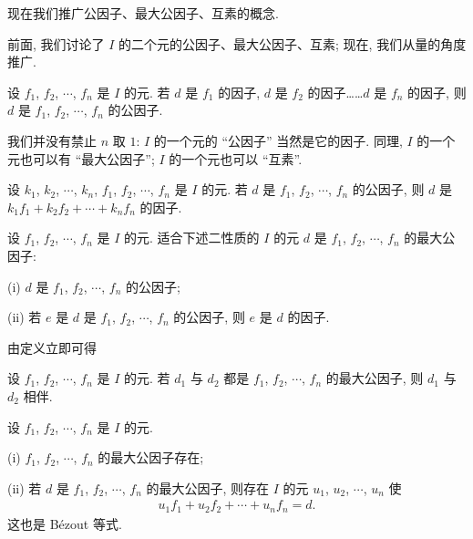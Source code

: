 现在我们推广公因子、最大公因子、互素的概念.

前面, 我们讨论了 $I$ 的二个元的公因子、最大公因子、互素; 现在, 我们从量的角度推广.

\begin{definition}
    设 $f_1$, $f_2$, $\cdots$, $f_n$ 是 $I$ 的元. 若 $d$ 是 $f_1$ 的因子, $d$ 是 $f_2$ 的因子……$d$ 是 $f_n$ 的因子, 则 $d$ 是 $f_1$, $f_2$, $\cdots$, $f_n$ 的公因子.
\end{definition}

\begin{remark}
    我们并没有禁止 $n$ 取 $1$: $I$ 的一个元的 ``公因子'' 当然是它的因子. 同理, $I$ 的一个元也可以有 ``最大公因子''; $I$ 的一个元也可以 ``互素''.
\end{remark}

\begin{proposition}
    设 $k_1$, $k_2$, $\cdots$, $k_n$, $f_1$, $f_2$, $\cdots$, $f_n$ 是 $I$ 的元. 若 $d$ 是 $f_1$, $f_2$, $\cdots$, $f_n$ 的公因子, 则 $d$ 是 $k_1 f_1 + k_2 f_2 + \cdots + k_n f_n$ 的因子.
\end{proposition}

\begin{definition}
    设 $f_1$, $f_2$, $\cdots$, $f_n$ 是 $I$ 的元. 适合下述二性质的 $I$ 的元 $d$ 是 $f_1$, $f_2$, $\cdots$, $f_n$ 的最大公因子:

    (i) $d$ 是 $f_1$, $f_2$, $\cdots$, $f_n$ 的公因子;

    (ii) 若 $e$ 是 $d$ 是 $f_1$, $f_2$, $\cdots$, $f_n$ 的公因子, 则 $e$ 是 $d$ 的因子.
\end{definition}

由定义立即可得
\begin{proposition}
    设 $f_1$, $f_2$, $\cdots$, $f_n$ 是 $I$ 的元. 若 $d_1$ 与 $d_2$ 都是 $f_1$, $f_2$, $\cdots$, $f_n$ 的最大公因子, 则 $d_1$ 与 $d_2$ 相伴.
\end{proposition}

\begin{proposition}
    设 $f_1$, $f_2$, $\cdots$, $f_n$ 是 $I$ 的元.

    (i) $f_1$, $f_2$, $\cdots$, $f_n$ 的最大公因子存在;

    (ii) 若 $d$ 是 $f_1$, $f_2$, $\cdots$, $f_n$ 的最大公因子, 则存在 $I$ 的元 $u_1$, $u_2$, $\cdots$, $u_n$ 使
    \begin{align*}
        u_1 f_1 + u_2 f_2 + \cdots + u_n f_n = d.
    \end{align*}
    这也是 Bézout 等式.
\end{proposition}


